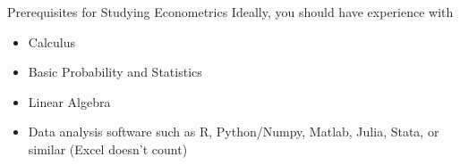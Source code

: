 \begin{frame}{Prerequisites for Studying Econometrics}
Ideally, you should have experience with
\begin{itemize}
	\item Calculus
	\item Basic Probability and Statistics 
	\item Linear Algebra 
	\item Data analysis software such as R, Python/Numpy, Matlab, Julia, Stata, or similar
		(Excel doesn't count) 
\end{itemize}
\end{frame}
% 


